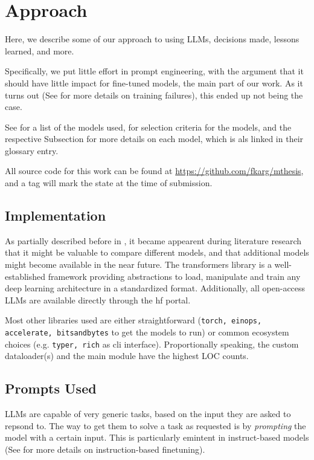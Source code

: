 \chapter{Approach}\label{chap:approach}
Here, we describe some of our approach to using \glspl{LLM}, decisions made, lessons learned, and more.

Specifically, we put little effort in prompt engineering, with the argument that it should have little impact for fine-tuned models, the main part of our work. As it turns out (See  for more details on training failures), this ended up not being the case.

See  for a list of the models used,  for selection criteria for the models, and the respective Subsection for more details on each model, which is als linked in their glossary entry.

All source code for this work can be found at \url{https://github.com/fkarg/mthesis}, and a tag will mark the state at the time of submission.

\section{Implementation}\label{sec:impl}
As partially described before in , it became appearent during literature research that it might be valuable to compare different models, and that additional models might become available in the near future.
The \acrlong{transformers} library is a well-established framework providing abstractions to load, manipulate and train any deep learning architecture in a standardized format.
Additionally, all open-access \glspl{LLM} are available directly through the \gls{hf} portal.

Most other libraries used are either straightforward (\texttt{torch, einops, accelerate, bitsandbytes} to get the models to run) or common ecosystem choices (e.g. \texttt{typer, rich} as cli interface).
Proportionally speaking, the custom dataloader(s) and the main module have the highest \gls{LOC} counts.



\section{Prompts Used}\label{sec:prompts}
\glspl{LLM} are capable of very generic tasks, based on the input they are asked to repsond to.
The way to get them to solve a task as requested is by \textit{prompting} the model with a certain input.
This is particularly emintent in instruct-based models (See  for more details on instruction-based finetuning).

